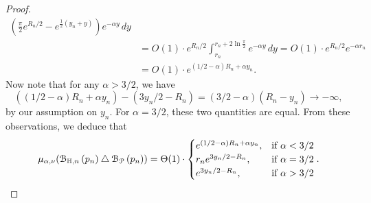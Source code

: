 \begin{proof}
\begin{align*}
		\left(\frac{\pi}{2} e^{R_n/2} - e^{\frac{1}{2} (y_n + y)}\right)e^{-\alpha y} \, dy \\
	&= O(1) \cdot e^{R_n/2} \int_{r_n}^{r_n + 2 \ln \frac{\pi}{2}} e^{-\alpha y} \, dy 
		= O(1) \cdot e^{R_n/2} e^{-\alpha r_n} \\
	&=O(1) \cdot e^{(1/2 - \alpha) R_n + \alpha y_n}.
\end{align*}
Now note that for any $\alpha > 3/2$, we have 
\[
	\left( (1/2 - \alpha) R_n + \alpha y_n\right) - \left(3y_n/2 - R_n \right)
	= (3/2 -\alpha) (R_n- y_n) \to -\infty,
\]
by our assumption on $y_n$. For $\alpha = 3/2$, these two quantities are equal. From these observations, we deduce that 
\[
	\mu_{\alpha,\nu} ({\mathcal B}_{\mathbb{H},n}\left(p_n\right) \bigtriangleup {\mathcal B}_{{\mathcal P}}\left(p_n\right) ) 
	= \Theta (1) \cdot \begin{cases} 
		e^{(1/2-\alpha)R_n + \alpha y_n}, & \mbox{if } \alpha < 3/2 \\
		r_n e^{3y_n/2 - R_n}, & \mbox{if }\alpha = 3/2\\
		e^{3y_n/2 - R_n}, &  \mbox{if } \alpha > 3/2 
	\end{cases}.
\]
\end{proof}

